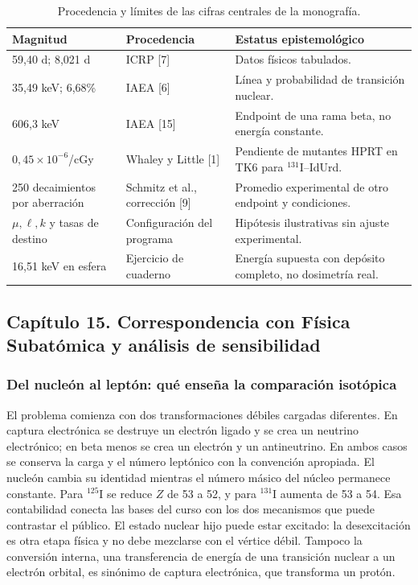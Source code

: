 \begin{table}[htbp]\centering\footnotesize
\begin{tabularx}{\linewidth}{@{}p{.24\linewidth}p{.31\linewidth}X@{}}
\toprule Magnitud & Procedencia & Estatus epistemológico \\\midrule
59,40 d; 8,021 d & ICRP [7] & Datos físicos tabulados. \\
35,49 keV; 6,68\% & IAEA [6] & Línea y probabilidad de transición nuclear. \\
606,3 keV & IAEA [15] & Endpoint de una rama beta, no energía constante. \\
$0,45\times10^{-6}$/cGy & Whaley y Little [1] & Pendiente de mutantes HPRT en TK6 para $^{131}$I--IdUrd. \\
250 decaimientos por aberración & Schmitz et al., corrección [9] & Promedio experimental de otro endpoint y condiciones. \\
$\mu,\ell,k$ y tasas de destino & Configuración del programa & Hipótesis ilustrativas sin ajuste experimental. \\
16,51 keV en esfera & Ejercicio de cuaderno & Energía supuesta con depósito completo, no dosimetría real. \\\bottomrule
\end{tabularx}
\caption{Procedencia y límites de las cifras centrales de la monografía.}
\end{table}

\clearpage
\subsection{Capítulo 15. Correspondencia con Física Subatómica y análisis de sensibilidad}
\label{ampliacion-programa}

\subsubsection{Del nucleón al leptón: qué enseña la comparación isotópica}
El problema comienza con dos transformaciones débiles cargadas diferentes.
En captura electrónica se destruye un electrón ligado y se crea un
neutrino electrónico; en beta menos se crea un electrón y un
antineutrino. En ambos casos se conserva la carga y el número leptónico
con la convención apropiada. El nucleón cambia su identidad mientras
el número másico del núcleo permanece constante. Para $^{125}$I se
reduce $Z$ de 53 a 52, y para $^{131}$I aumenta de 53 a 54. Esa
contabilidad conecta las bases del curso con los dos mecanismos que
puede contrastar el público. El estado nuclear hijo puede estar excitado:
la desexcitación es otra etapa física y no debe mezclarse con el vértice
débil. Tampoco la conversión interna, una transferencia de energía de
una transición nuclear a un electrón orbital, es sinónimo de captura
electrónica, que transforma un protón.

